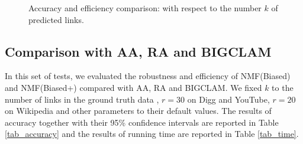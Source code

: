 \documentclass[10pt,journal,compsoc]{IEEEtran}
\newcommand{\Biased}{{\sf NMF(Biased)}\xspace}
\newcommand{\Aa}{{\sf AA}\xspace }
\newcommand{\RA}{{\sf RA}\xspace }
\newcommand{\BIGCLAM}{{\sf BIGCLAM}\xspace}
\newcommand{\Digg}{{\sf Digg}\xspace}
\newcommand{\YouTube}{{\sf YouTube}\xspace}
\newcommand{\Wikipedia}{{\sf Wikipedia}\xspace}
\newcommand{\Biasedp}{{\sf NMF(Biased+)}\xspace}
\begin{document}
\begin{figure}[tb!]
  \hspace{-3ex}
  \hspace{-3ex}
  \hspace{-3ex}
  \vspace{-1ex}
  \caption{Accuracy and efficiency comparison: with respect to the number $k$ of predicted links.}\label{fig_exp_2_1}
  \vspace{-1ex}
\end{figure}



\subsection{Comparison with \Aa, \RA and \BIGCLAM}
In this set of tests, we evaluated the robustness and efficiency of \Biased and \Biasedp
compared with \Aa, \RA and \BIGCLAM. We fixed $k$ to the number of links
in the ground truth data \cite{yang2015}, $r = 30$ on \Digg and \YouTube, $r = 20$ on \Wikipedia
and other parameters to their default values.
The results of accuracy together with their 95\% confidence intervals are reported
in Table \ref{tab_accuracy} and the results of running time are reported in Table \ref{tab_time}.
\end{document}
